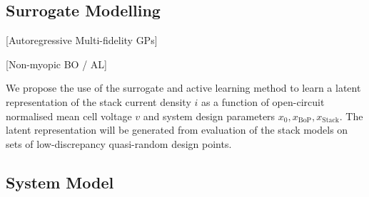 
\subsection{Surrogate Modelling}

[Autoregressive Multi-fidelity GPs]

[Non-myopic BO / AL]

We propose the use of the surrogate and active learning method to learn a latent representation of the stack current density $i$ as a function of open-circuit normalised mean cell voltage $v$ and system design parameters $x_0, x_{\text{BoP}}, x_{\text{Stack}}$.
The latent representation will be generated from evaluation of the stack models on sets of low-discrepancy quasi-random design points.

\subsection{System Model}

